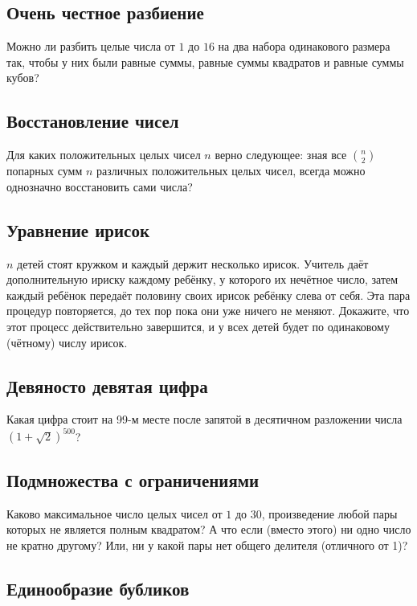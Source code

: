 \subsection*{Очень честное разбиение}

Можно ли разбить целые числа от $1$ до $16$ на два набора одинакового размера так,
чтобы у них были равные суммы, равные суммы квадратов и равные суммы кубов?

\subsection*{Восстановление чисел}
Для каких положительных целых чисел $n$ верно следующее: зная все $\binom n2$ попарных сумм $n$ различных положительных целых чисел, всегда можно однозначно восстановить сами числа?


\subsection*{Уравнение ирисок}

$n$ детей стоят кружком и каждый держит несколько ирисок.
Учитель даёт дополнительную ириску каждому ребёнку, у которого их нечётное число,
затем каждый ребёнок передаёт половину своих ирисок ребёнку слева от себя.
Эта пара процедур повторяется, до тех пор пока они уже ничего не меняют.
Докажите, что этот процесс действительно завершится, и у всех детей будет по одинаковому (чётному) числу ирисок.

\subsection*{Девяносто девятая цифра}

Какая цифра стоит на 99-м месте после запятой в десятичном разложении числа 
$(1+\sqrt2)^{500}$?

\subsection*{Подмножества с ограничениями}

Каково максимальное число целых чисел от $1$ до $30$, произведение любой пары которых не является полным квадратом?
А что если (вместо этого) ни одно число не кратно другому?
Или, ни у какой пары нет общего делителя (отличного от 1)?

\subsection*{Единообразие бубликов}

